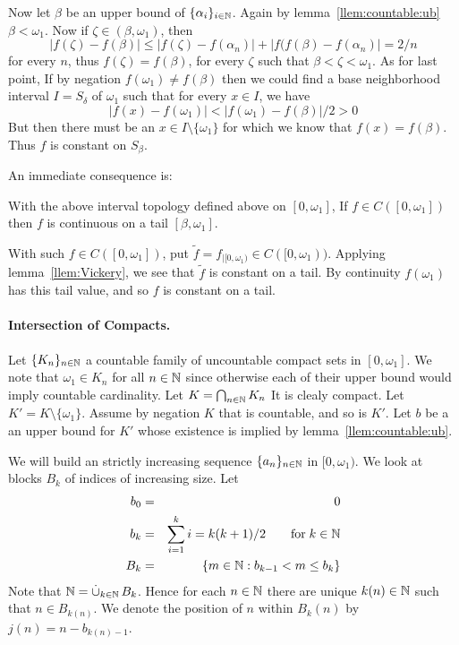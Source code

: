\begin{enumerate}
\begin{thmproof}
Now let \(\beta\) be an upper bound of \(\{\alpha_i\}_{i\in \mathbb{N}}\).
Again by lemma~\ref{llem:countable:ub} \(\beta<\omega_1\).
Now if \(\zeta\in(\beta,\omega_1)\), then
\begin{equation*}
|f(\zeta) - f(\beta)| \leq
|f(\zeta) - f(\alpha_n)| + |f(f(\beta) - f(\alpha_n)| = 2/n
\end{equation*}
for every $n$, thus \(f(\zeta) = f(\beta)\), for every \(\zeta\) such that
\(\beta < \zeta < \omega_1\).
As for last point, If by negation \(f(\omega_1)\neq f(\beta)\) then we could
find a base neighborhood interval \(I=S_{\delta}\) of \(\omega_1\)
such that for every \(x\in I\), we have
\begin{equation*}
|f(x)-f(\omega_1)| < |f(\omega_1) - f(\beta)| / 2 > 0
\end{equation*}
But then there must be an \(x\in I\setminus\{\omega_1\}\)
for which we know that \(f(x)=f(\beta)\).
Thus $f$ is constant on \(S_\beta\).
\end{thmproof}

An immediate consequence is:
\begin{llem}
With the above interval topology defined above on \([0,\omega_1]\),
If \(f\in C([0,\omega_1])\)
then $f$ is continuous on a tail \([\beta,\omega_1]\).
\end{llem}
\begin{thmproof}
With such \(f\in C([0,\omega_1])\),
put \(\tilde{f} = f_{|[0,\omega_1)}\in C([0,\omega_1))\).
Applying lemma~\ref{llem:Vickery}, we see that \(\tilde{f}\)
is constant on a tail. By continuity \(f(\omega_1)\) has this tail value,
and so $f$ is constant on a tail.
\end{thmproof}


\paragraph{Intersection of Compacts.}
Let \(\{K_n\}_{n\in\mathbb{N}}\) a countable family of uncountable compact sets
in \([0,\omega_1]\). We note that \(\omega_1\in K_n\) for all \(n\in\mathbb{N}\)
since otherwise each of their upper bound would imply countable cardinality.
Let \(K = \bigcap_{n\in\mathbb{N}} K_n\) It is clealy compact.
Let \(K'=K\setminus \{\omega_1\}\).
Assume by negation $K$ that is countable, and so is \(K'\).
Let $b$ be a an upper bound for \(K'\) whose existence
is implied by lemma~\ref{llem:countable:ub}.

We will build an strictly increasing sequence \(\{a_n\}_{n\in\mathbb{N}}\)
in \([0,\omega_1)\). We look at blocks \(B_k\) of indices of increasing size.
Let
\begin{eqnarray*}
b_0 &=& 0 \\
b_k &=& \sum_{i=1}^k i = k(k+1)/2 \qquad \textrm{for}\; k\in\mathbb{N} \\
B_k &=& \{m\in\mathbb{N}: b_{k-1} < m \leq b_k\}
\end{eqnarray*}
Note that \(\N = \disjunion_{k\in\N} B_k\). Hence
for each \(n\in\mathbb{N}\) there are unique \(k(n)\in\mathbb{N}\) such that \(n\in B_{k(n)}\).
We denote the position of $n$ within \(B_k(n)\)
by \(j(n) = n - b_{k(n)-1}\).


\end{enumerate}
